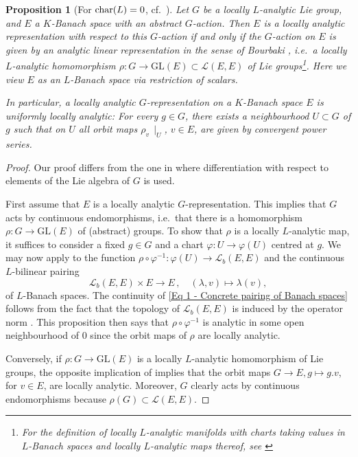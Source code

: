 \documentclass[a4paper, reqno, 10pt]{amsart}
\newtheorem{proposition}[theorem]{Proposition}
\theoremstyle{definition}
\numberwithin{equation}{section}
\newcommand{\GL}{{\mathrm{GL}}}
\newcommand{\lra}{\longrightarrow}
\newcommand{\lto}{\longmapsto}
\newcommand{\mto}{\mapsto}
\newcommand{\ra}{\rightarrow}
\newcommand{\res}[1]{{\!\,\mid_{#1}}}
\newcommand{\CL}{{\mathcal {L}}}
\begin{document}
\begin{proposition}[{For ${\rm char}(L)=0$, cf.\ \cite[Kor.\ 3.1.9]{FeauxdeLacroix99TopDarstpAdischLieGrp}}]\label{Prop 1 - Equivalent characterization for locally analytic representations on Banach spaces}
	Let $G$ be a locally $L$-analytic Lie group, and $E$ a $K$-Banach space with an abstract $G$-action.
	Then $E$ is a locally analytic representation with respect to this $G$-action if and only if the $G$-action on $E$ is given by an analytic linear representation in the sense of Bourbaki \cite[III.\ \S 1.2 Expl.\ (3)]{Bourbaki89LieGrpLieAlg1to3}, i.e.\ a locally $L$-analytic homomorphism $\rho\colon G \ra \GL(E)\subset \CL(E,E)$ of Lie groups\footnote{For the definition of locally $L$-analytic manifolds with charts taking values in $L$-Banach spaces and locally $L$-analytic maps thereof, see \cite[\S 5.1]{Bourbaki07VarDiffAnFasciDeResult}}.
	Here we view $E$ as an $L$-Banach space via restriction of scalars.
	
	
	In particular, a locally analytic $G$-representation on a $K$-Banach space $E$ is \textit{uniformly locally analytic}: For every $g\in G$, there exists a neighbourhood $U\subset G$ of $g$ such that on $U$ all orbit maps $\rho_v\res{U}$, $v\in E$, are given by convergent power series.
\end{proposition}
\begin{proof}
	Our proof differs from the one in \cite{FeauxdeLacroix99TopDarstpAdischLieGrp} where differentiation with respect to elements of the Lie algebra of $G$ is used.
	
	
	First assume that $E$ is a locally analytic $G$-representation.
	This implies that $G$ acts by continuous endomorphisms, i.e.\ that there is a homomorphism $\rho \colon G \ra \GL(E)$ of (abstract) groups.
	To show that $\rho$ is a locally $L$-analytic map, it suffices to consider a fixed $g\in G$ and a chart $\varphi\colon U \ra \varphi(U)$ centred at $g$.
	We may now apply  to the function $\rho \circ \varphi^{-1} \colon \varphi(U)\ra \CL_b(E,E)$ and the continuous $L$-bilinear pairing
	\begin{equation}\label{Eq 1 - Concrete pairing of Banach spaces}
		\CL_b(E,E) \times E \lra E \,,\quad (\lambda, v)  \lto \lambda(v),
	\end{equation}
	of $L$-Banach spaces.
	The continuity of \eqref{Eq 1 - Concrete pairing of Banach spaces} follows from the fact that the topology of $\CL_b(E,E)$ is induced by the operator norm \cite[Rmk.\ 6.7]{Schneider02NonArchFunctAna}.
	This proposition then says that $\rho \circ \varphi^{-1}$ is analytic in some open neighbourhood of $0$ since the orbit maps of $\rho$ are locally analytic.
	
	Conversely, if $\rho\colon G \ra \GL(E)$ is a locally $L$-analytic homomorphism of Lie groups, the opposite implication of  implies that the orbit maps $G \ra E, g\mto g.v$, for $v\in E$, are locally analytic.
	Moreover, $G$ clearly acts by continuous endomorphisms because $\rho(G) \subset \CL(E,E)$.
\end{proof}
\end{document}
